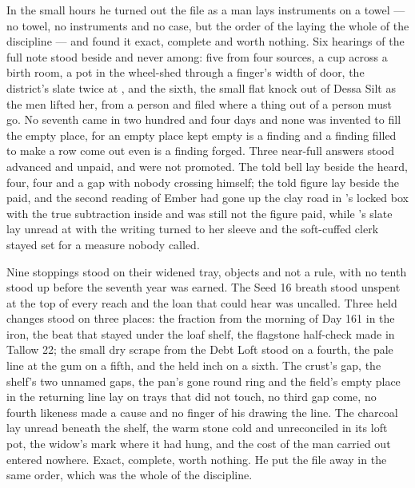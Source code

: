 \scenebreak

In the small hours he turned out the file as a man lays instruments on a towel --- no towel, no instruments and no case, but the order of the laying the whole of the discipline --- and found it exact, complete and worth nothing. Six hearings of the full note stood beside and never among: five from four sources, a cup across a birth room, a pot in the wheel-shed through a finger's width of door, the district's slate twice at , and the sixth, the small flat knock out of Dessa Silt as the men lifted her, from a person and filed where a thing out of a person must go. No seventh came in two hundred and four days and none was invented to fill the empty place, for an empty place kept empty is a finding and a finding filled to make a row come out even is a finding forged. Three near-full answers stood advanced and unpaid, and were not promoted. The told bell lay beside the heard, four, four and a gap with nobody crossing himself; the told figure lay beside the paid, and the second reading of Ember had gone up the clay road in 's locked box with the true subtraction inside and was still not the figure paid, while 's slate lay unread at  with the writing turned to her sleeve and the soft-cuffed clerk stayed set for a measure nobody called.

Nine stoppings stood on their widened tray, objects and not a rule, with no tenth stood up before the seventh year was earned. The Seed 16 breath stood unspent at the top of every reach and the loan that could hear was uncalled. Three held changes stood on three places: the fraction from the morning of Day 161 in the iron, the beat that stayed under the loaf shelf, the flagstone half-check made in Tallow 22; the small dry scrape from the Debt Loft stood on a fourth, the pale line at the gum on a fifth, and the held inch on a sixth. The crust's gap, the shelf's two unnamed gaps, the pan's gone round ring and the field's empty place in the returning line lay on trays that did not touch, no third gap come, no fourth likeness made a cause and no finger of his drawing the line. The charcoal lay unread beneath the shelf, the warm stone cold and unreconciled in its loft pot, the widow's mark where it had hung, and the cost of the man carried out entered nowhere. Exact, complete, worth nothing. He put the file away in the same order, which was the whole of the discipline.

